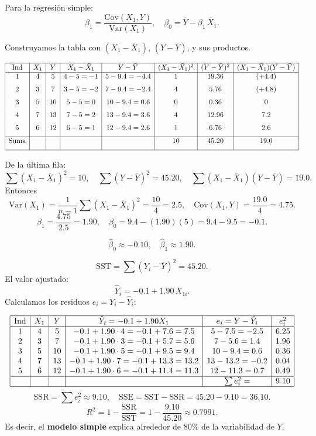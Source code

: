 \documentclass[10pt,a4paper]{article}
\begin{document}
\begin{enumerate}
\begin{enumerate}
Para la regresión simple:
\[
\beta_1
= \frac{\mathrm{Cov}(X_1,Y)}{\mathrm{Var}(X_1)},
\quad
\beta_0
= \bar{Y} - \beta_1\,\bar{X}_1.
\]

Construyamos la tabla con $(X_1-\bar{X}_1)$, $(Y-\bar{Y})$, y sus productos.

\[
\begin{array}{|c|c|c|c|c|c|c|c|}
\hline
\text{Ind} & X_1 & Y 
& X_1-\bar{X}_1 & Y-\bar{Y}
& (X_1 - \bar{X}_1)^2 & (Y - \bar{Y})^2
& (X_1-\bar{X}_1)(Y-\bar{Y})\\
\hline
1 & 4 & 5 
& 4-5=-1
& 5-9.4=-4.4
& 1
& 19.36
& (+4.4) \\[6pt]
2 & 3 & 7
& 3-5=-2
& 7-9.4=-2.4
& 4
& 5.76
& (+4.8) \\[6pt]
3 & 5 & 10
& 5-5=0
& 10-9.4=0.6
& 0
& 0.36
& 0 \\[6pt]
4 & 7 & 13
& 7-5=2
& 13-9.4=3.6
& 4
& 12.96
& 7.2 \\[6pt]
5 & 6 & 12
& 6-5=1
& 12-9.4=2.6
& 1
& 6.76
& 2.6 \\[6pt]
\hline
\text{Suma} & & & & 
& 10
& 45.20
& 19.0 \\[6pt]
\hline
\end{array}
\]

De la última fila:
\[
\sum (X_1-\bar{X}_1)^2 = 10,
\quad
\sum (Y - \bar{Y})^2 = 45.20,
\quad
\sum (X_1-\bar{X}_1)(Y-\bar{Y}) = 19.0.
\]
Entonces
\[
\mathrm{Var}(X_1)
= \frac{1}{n-1}\sum (X_1-\bar{X}_1)^2
= \frac{10}{4}
= 2.5,
\quad
\mathrm{Cov}(X_1,Y)
= \frac{19.0}{4}
= 4.75.
\]
\[
\beta_1
= \frac{4.75}{2.5}
= 1.90,
\quad
\beta_0
= 9.4 - (1.90)(5)
= 9.4 - 9.5
= -0.1.
\]

\[
\boxed{
\widehat{\beta}_0 \approx -0.10,
\quad
\widehat{\beta}_1 \approx 1.90.
}
\]


\[
\text{SST}
= \sum (Y_i - \bar{Y})^2
= 45.20.
\]
El valor ajustado: 
\[
\hat{Y}_i
= -0.1 +1.90\,X_{1i}.
\]
Calculamos los residuos $e_i = Y_i - \hat{Y}_i$:

\[
\begin{array}{|c|c|c|c|c|c|}
\hline
\text{Ind} & X_1 & Y 
& \hat{Y}_i = -0.1 +1.90X_1
& e_i= Y-\hat{Y}_i
& e_i^2
\\\hline
1 & 4 & 5 
& -0.1 +1.90\cdot4 =-0.1 +7.6=7.5
& 5-7.5=-2.5
& 6.25
\\
2 & 3 &7
& -0.1 +1.90\cdot3 =-0.1 +5.7=5.6
& 7-5.6=1.4
& 1.96
\\
3 & 5 &10
& -0.1 +1.90\cdot5 =-0.1 +9.5=9.4
& 10-9.4=0.6
& 0.36
\\
4 & 7 &13
& -0.1 +1.90\cdot7 =-0.1 +13.3=13.2
& 13-13.2=-0.2
& 0.04
\\
5 & 6 &12
& -0.1 +1.90\cdot6 =-0.1 +11.4=11.3
& 12-11.3=0.7
& 0.49
\\
\hline
& & & & \sum e_i^2= & 9.10
\\\hline
\end{array}
\]
\[
\text{SSR} = \sum e_i^2 \approx 9.10,
\quad
\text{SSE} = \text{SST} - \text{SSR} = 45.20 -9.10=36.10.
\]
\[
R^2
= 1 - \frac{\text{SSR}}{\text{SST}}
= 1 - \frac{9.10}{45.20}
\approx 0.7991.
\]
Es decir, el \textbf{modelo simple} explica alrededor de $80\%$ de la variabilidad de $Y$.


\end{enumerate}
\end{enumerate}
\end{document}
